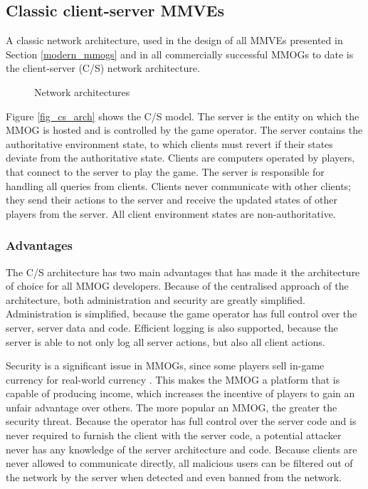 \subsection{Classic client-server MMVEs}

A classic network architecture, used in the design of all MMVEs presented in Section \ref{modern_mmogs} and in all commercially successful MMOGs to date is the client-server (C/S) network architecture.

\begin{figure}[htbp]
\centering
\caption{Network architectures}
\end{figure}

Figure \ref{fig_cs_arch} shows the C/S model. The server is the entity on which the MMOG is hosted and is controlled by the game operator. The server contains the authoritative environment state, to which clients must revert if their states deviate from the authoritative state. Clients are computers operated by players, that connect to the server to play the game. The server is responsible for handling all queries from clients. Clients never communicate with other clients; they send their actions to the server and receive the updated states of other players from the server. All client environment states are non-authoritative.

\subsubsection{Advantages}

The C/S architecture has two main advantages that has made it the architecture of choice for all MMOG developers. Because of the centralised approach of the architecture, both administration and security are greatly simplified. Administration is simplified, because the game operator has full control over the server, server data and code. Efficient logging is also supported, because the server is able to not only log all server actions, but also all client actions.

Security is a significant issue in MMOGs, since some players sell in-game currency for real-world currency \cite{chinese_gold_farmer}. This makes the MMOG a platform that is capable of producing income, which increases the incentive of players to gain an unfair advantage over others. The more popular an MMOG, the greater the security threat. Because the operator has full control over the server code and is never required to furnish the
client with the server code, a potential attacker never has any knowledge of the server architecture and code. Because clients are never allowed to communicate directly, all malicious users can be filtered out of the network by the server when detected and even banned from the network.

